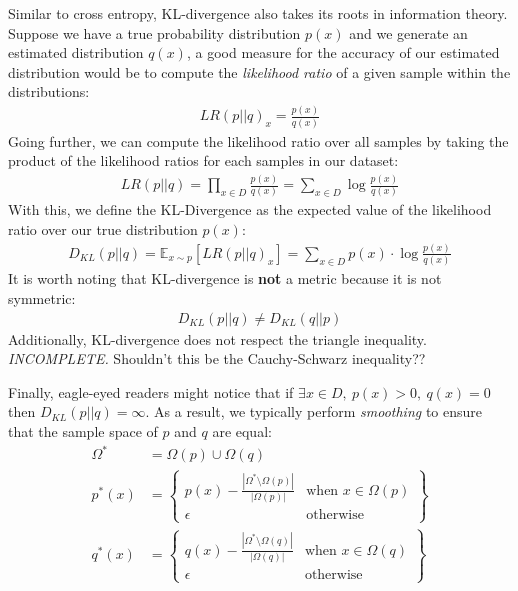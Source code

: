 \documentclass[paper=a4, fontsize=12pt]{scrartcl} %
\numberwithin{equation}{section} %
\numberwithin{figure}{section} %
\numberwithin{table}{section} %
\begin{document}
Similar to cross entropy, KL-divergence also takes its roots in information theory. Suppose we have a true probability distribution $p(x)$ and we generate 
an estimated distribution $q(x)$, a good measure for the accuracy of our estimated distribution would be to compute the \textit{likelihood ratio} of a given sample 
within the distributions:
\begin{align*}
    LR(p || q)_x = \frac{p(x)}{q(x)}
\end{align*}
Going further, we can compute the likelihood ratio over all samples by taking the product of the likelihood ratios for each samples in our dataset:
\begin{align*}
    LR(p || q) = \prod_{x \in D} \frac{p(x)}{q(x)} = \sum_{x \in D} \log \frac{p(x)}{q(x)}
\end{align*}
With this, we define the KL-Divergence as the expected value of the likelihood ratio over our true distribution $p(x)$:
\begin{align*}
    D_{KL}(p || q) = \mathbb{E}_{x \sim p} \left[ LR(p || q)_x \right] = \sum_{x \in D} p(x) \cdot \log \frac{p(x)}{q(x)}
\end{align*}
It is worth noting that KL-divergence is \textbf{not} a metric because it is not symmetric:
\begin{align*}
    D_{KL}(p || q) \neq D_{KL}(q || p)
\end{align*}
Additionally, KL-divergence does not respect the triangle inequality. \textit{INCOMPLETE.} Shouldn't this be the Cauchy-Schwarz inequality??

Finally, eagle-eyed readers might notice that if $\exists x \in D,\ p(x) > 0,\ q(x) = 0$ then $D_{KL}(p || q) = \infty$. As a result, we typically perform 
\textit{smoothing} to ensure that the sample space of $p$ and $q$ are equal:
\begin{align*}
    \Omega^* &= \Omega(p) \cup \Omega(q) \\
    p^*(x) &= \left.
        \begin{cases}
            p(x) - \frac{|\Omega^* \setminus \Omega(p)|}{|\Omega(p)|} & \text{when } x \in \Omega(p) \\
            \epsilon & \text{otherwise}
        \end{cases}
    \right\} \\
    q^*(x) &= \left.
    \begin{cases}
        q(x) - \frac{|\Omega^* \setminus \Omega(q)|}{|\Omega(q)|} & \text{when } x \in \Omega(q) \\
        \epsilon & \text{otherwise}
    \end{cases}
\right\}
\end{align*}
\end{document}
